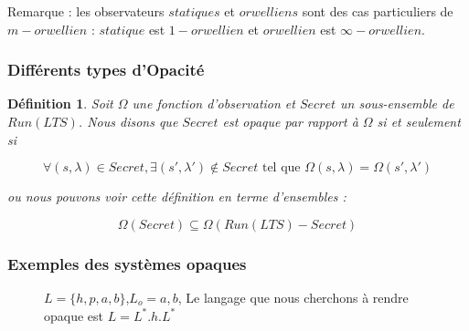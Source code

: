 \documentclass[10pt,a4paper]{article}
\newtheorem{mydef}{D\'efinition}
\begin{document}
	Remarque : les observateurs $statiques$ et $orwelliens$ sont des cas particuliers de $m-orwellien$ : $statique$ est $1-orwellien$ et $orwellien$ est $\infty-orwellien$.

	
\subsubsection{Diff\'erents types d'Opacit\'e}

\begin{mydef}
	Soit $\Omega$ une fonction d'observation et $Secret$ un sous-ensemble de $Run(LTS)$. Nous disons que $Secret$ est opaque par rapport \`a $\Omega$ si et seulement si
	
	$$\forall (s,\lambda) \in Secret, \exists (s',\lambda')\not\in Secret \mbox{ tel que } \Omega(s,\lambda) = \Omega (s',\lambda')$$
	
	ou nous pouvons voir cette d\'efinition en terme d'ensembles :
	
	$$\Omega(Secret)\subseteq \Omega(Run(LTS)-Secret)$$
\end{mydef}

\subsubsection{Exemples des syst\`emes opaques}
		\begin{figure}[H]
                \centering
                \caption{$L = \{h,p,a,b\}$,$L_o = {a,b}$, Le langage que nous cherchons \`a rendre opaque est $L = L^*.h.L^*$}
		\end{figure}		
		
\end{document}
